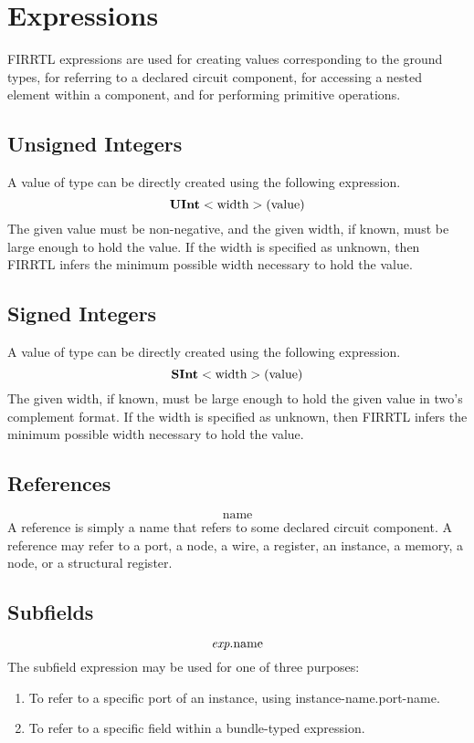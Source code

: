 \documentclass[12pt]{article}
\begin{document}
\section{Expressions}

FIRRTL expressions are used for creating values corresponding to the ground types, for referring to a declared circuit component, for accessing a nested element within a component, and for performing primitive operations. 

\subsection{Unsigned Integers}

A value of type  can be directly created using the following expression.
\[
\text{\bf UInt}<\text{width}>(\text{value})
\]
The given value must be non-negative, and the given width, if known, must be large enough to hold the value.
If the width is specified as unknown, then FIRRTL infers the minimum possible width necessary to hold the value.

\subsection{Signed Integers}

A value of type  can be directly created using the following expression.
\[
\text{\bf SInt}<\text{width}>(\text{value})
\]
The given width, if known, must be large enough to hold the given value in two's complement format.
If the width is specified as unknown, then FIRRTL infers the minimum possible width necessary to hold the value.

\subsection{References}
\[
\text{name}
\]
A reference is simply a name that refers to some declared circuit component.
A reference may refer to a port, a node, a wire, a register, an instance, a memory, a node, or a structural register.

\subsection{Subfields}
\[
\text{\em exp}.\text{name}
\]
The subfield expression may be used for one of three purposes:
\begin{enumerate}
\item To refer to a specific port of an instance, using instance-name.port-name. 
\item To refer to a specific field within a bundle-typed expression.
\end{enumerate}
\end{document}
